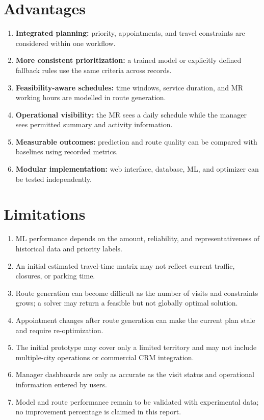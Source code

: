 \documentclass[12pt,a4paper,oneside]{report}
\begin{document}
\section{Advantages}
\begin{enumerate}[leftmargin=1.2cm]
\item \textbf{Integrated planning:} priority, appointments, and travel constraints are considered within one workflow.
\item \textbf{More consistent prioritization:} a trained model or explicitly defined fallback rules use the same criteria across records.
\item \textbf{Feasibility-aware schedules:} time windows, service duration, and MR working hours are modelled in route generation.
\item \textbf{Operational visibility:} the MR sees a daily schedule while the manager sees permitted summary and activity information.
\item \textbf{Measurable outcomes:} prediction and route quality can be compared with baselines using recorded metrics.
\item \textbf{Modular implementation:} web interface, database, ML, and optimizer can be tested independently.
\end{enumerate}

\section{Limitations}
\begin{enumerate}[leftmargin=1.2cm]
\item ML performance depends on the amount, reliability, and representativeness of historical data and priority labels.
\item An initial estimated travel-time matrix may not reflect current traffic, closures, or parking time.
\item Route generation can become difficult as the number of visits and constraints grows; a solver may return a feasible but not globally optimal solution.
\item Appointment changes after route generation can make the current plan stale and require re-optimization.
\item The initial prototype may cover only a limited territory and may not include multiple-city operations or commercial CRM integration.
\item Manager dashboards are only as accurate as the visit status and operational information entered by users.
\item Model and route performance remain to be validated with experimental data; no improvement percentage is claimed in this report.
\end{enumerate}
\end{document}
